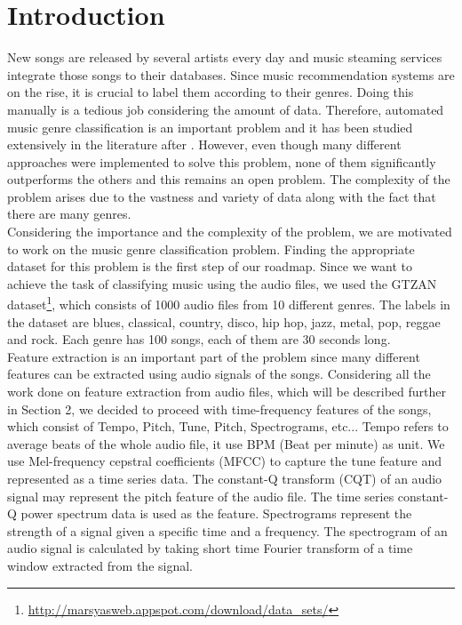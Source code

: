 \documentclass[acmtog, authorversion]{acmart}
\begin{document}
\section{Introduction}
New songs are released by several artists every day and music steaming services integrate those songs to their databases. Since music recommendation systems
are on the rise, it is crucial to label them according to their genres. Doing this manually is a tedious job considering the amount of data. Therefore, automated
music genre classification is an important problem and it has been studied extensively in the literature after \cite{tzanetakis2002musical}.
However, even though many different approaches were implemented to solve this problem, none of them significantly outperforms the others and this remains an
open problem. The complexity of the problem arises due to the vastness and variety of data along with the fact that there are many genres. \\
Considering the importance and the complexity of the problem, we are motivated to work on the music genre classification problem. Finding the appropriate dataset for this problem is the first step of our roadmap. 
Since we want to achieve the task of classifying music using the audio files, we used the GTZAN dataset\footnote{\url{http://marsyasweb.appspot.com/download/data_sets/}}, which consists of 1000 audio files from 10 different
genres. The labels in the dataset are blues, classical, country, disco, hip hop, jazz, metal, pop, reggae and rock. Each genre has 100 songs, each of them are 
30 seconds long. \\
Feature extraction is an important part of the problem since many different features can be extracted using audio signals of the songs.  
Considering all the work done on feature extraction from audio files, which will be described further in Section 2, we decided to proceed with 
time-frequency features of the songs, which consist of Tempo, Pitch, Tune, Pitch, Spectrograms, etc... Tempo refers to average beats of the whole audio file, it use BPM (Beat per minute) as unit. We use Mel-frequency cepstral coefficients (MFCC) to capture the tune feature and represented as a time series data. The constant-Q transform (CQT) of an audio signal may represent the pitch feature of the audio file. The time series constant-Q power spectrum data is used as the feature. Spectrograms represent the strength of a signal given a specific time and a frequency. The spectrogram of an audio signal is calculated
by taking short time Fourier transform of a time window extracted from the signal.\\
\end{document}
